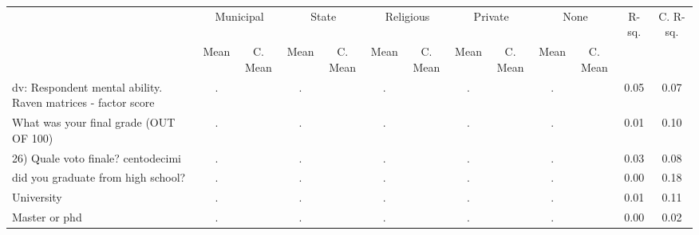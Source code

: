\begin{tabular}{l c c c c c c c c c c c c}
\toprule
& \multicolumn{2}{c}{Municipal} & \multicolumn{2}{c}{State} & \multicolumn{2}{c}{Religious} & \multicolumn{2}{c}{Private} & \multicolumn{2}{c}{None} & R-sq. & C. R-sq. \\
& \scriptsize Mean & \scriptsize C. Mean & \scriptsize Mean & \scriptsize C. Mean & \scriptsize Mean & \scriptsize C. Mean & \scriptsize Mean & \scriptsize C. Mean & \scriptsize Mean & \scriptsize C. Mean & & \\
\midrule
dv: Respondent mental ability. Raven matrices - factor score &         . & &         . & &         . & &         . & &         . & &      0.05 &      0.07 \\
What was your final grade (OUT OF 100) &         . & &         . & &         . & &         . & &         . & &      0.01 &      0.10 \\
26) Quale voto finale? centodecimi &         . & &         . & &         . & &         . & &         . & &      0.03 &      0.08 \\
did you graduate from high school? &         . & &         . & &         . & &         . & &         . & &      0.00 &      0.18 \\
University &         . & &         . & &         . & &         . & &         . & &      0.01 &      0.11 \\
Master or phd   &         . & &         . & &         . & &         . & &         . & &      0.00 &      0.02 \\
\bottomrule
\end{tabular}
